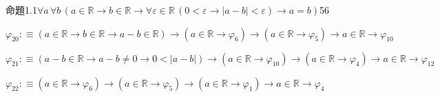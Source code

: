 \begin{fullproof}{命題1.1}{$\forall a\,\forall b\,(a \in \mathbb{R} \to b \in \mathbb{R} \to \forall \varepsilon \in \mathbb{R}\,(0 < \varepsilon \to \lvert a - b \rvert < \varepsilon) \to a = b)$}{56}
\begin{abbrevlist}
\item $\varphi_{20} :\equiv (a \in \mathbb{R} \to b \in \mathbb{R} \to a - b \in \mathbb{R}) \to (a \in \mathbb{R} \to \varphi_{6}) \to (a \in \mathbb{R} \to \varphi_{5}) \to a \in \mathbb{R} \to \varphi_{10}$
\item $\varphi_{21} :\equiv (a - b \in \mathbb{R} \to a - b \neq 0 \to 0 < \lvert a - b \rvert) \to (a \in \mathbb{R} \to \varphi_{10}) \to (a \in \mathbb{R} \to \varphi_{4}) \to a \in \mathbb{R} \to \varphi_{12}$
\item $\varphi_{22} :\equiv (a \in \mathbb{R} \to \varphi_{6}) \to (a \in \mathbb{R} \to \varphi_{5}) \to (a \in \mathbb{R} \to \varphi_{1}) \to a \in \mathbb{R} \to \varphi_{4}$
\end{abbrevlist}
\end{fullproof}
